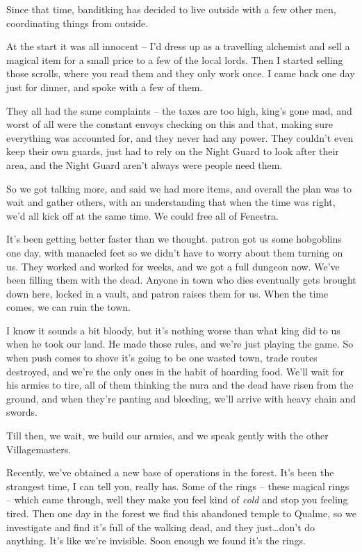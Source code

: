Since that time, \gls{banditking} has decided to live outside with a few other men, coordinating things from outside.

\begin{speechtext}
	At the start it was all innocent -- I'd dress up as a travelling alchemist and sell a magical item for a small price to a few of the local lords.  Then I started selling those scrolls, where you read them and they only work once.  I came back one day just for dinner, and spoke with a few of them.

	They all had the same complaints -- the taxes are too high, \gls{king}'s gone mad, and worst of all were the constant envoys checking on this and that, making sure everything was accounted for, and they never had any power.  They couldn't even keep their own guards, just had to rely on the Night Guard to look after their area, and the Night Guard aren't always were people need them.

	So we got talking more, and said we had more items, and overall the plan was to wait and gather others, with an understanding that when the time was right, we'd all kick off at the same time.  We could free all of Fenestra.

	It's been getting better faster than we thought.  \Gls{patron} got us some hobgoblins one day, with manacled feet so we didn't have to worry about them turning on us.  They worked and worked for weeks, and we got a full dungeon now.  We've been filling them with the dead.  Anyone in town who dies eventually gets brought down here, locked in a vault, and \gls{patron} raises them for us.  When the time comes, we can ruin the town.

	I know it sounds a bit bloody, but it's nothing worse than what \gls{king} did to us when he took our land.  He made those rules, and we're just playing the game.  So when push comes to shove it's going to be one wasted town, trade routes destroyed, and we're the only ones in the habit of hoarding food.  We'll wait for his armies to tire, all of them thinking the nura and the dead have risen from the ground, and when they're panting and bleeding, we'll arrive with heavy chain and swords.

Till then, we wait, we build our armies, and we speak gently with the other Villagemasters.

	Recently, we've obtained a new base of operations in the forest.  It's been the strangest time, I can tell you, really has.  Some of the rings -- these magical rings -- which came through, well they make you feel kind of \emph{cold} and stop you feeling tired.  Then one day in the forest we find this abandoned temple to Qualme, so we investigate and find it's full of the walking dead, and they just\ldots don't do anything.  It's like we're invisible.  Soon enough we found it's the rings.


\end{speechtext}
